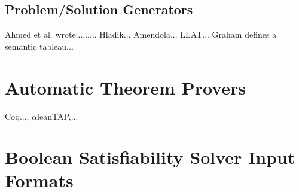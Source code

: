 \documentclass[ms]{uncgdissertationexp2}
\theoremstyle{plain}
\theoremstyle{definition}
\theoremstyle{remark}
\begin{document}
        \subsection{Problem/Solution Generators}
        Ahmed et al. wrote.........
        Hladik...
        Amendola...
        LLAT... Graham defines a semantic tableau...
    \section{Automatic Theorem Provers}
    Coq..., $\alpha$\textsf{lean}TAP,... 
    \section{Boolean Satisfiability Solver Input Formats} 
\end{document}
